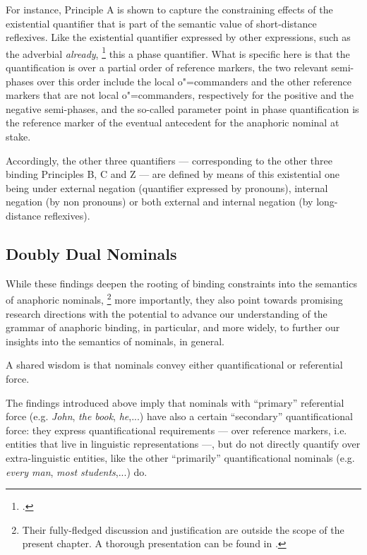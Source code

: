 \documentclass[output=paper
	        ,collection
	        ,collectionchapter
 	        ,biblatex
                ,babelshorthands
                ,newtxmath
                ,draftmode
                ,colorlinks, citecolor=brown
]{langscibook}
\begin{document}
For instance, Principle A is shown to capture the constraining effects of the existential quantifier 
that is part of the semantic value of short-distance reflexives. Like the existential
quantifier expressed by other expressions, such as the adverbial {\em already},%
\footnote{
\citep{Lobner1987}.
}
this a phase quantifier. What is specific here is that the quantification is over
a partial order of reference markers,  the two relevant semi-phases over this order
include the local o"=commanders and the other reference markers that are not
local o"=commanders, respectively for the positive and the negative semi-phases,
and the so-called parameter point in phase quantification is the reference
marker of the eventual antecedent for the anaphoric nominal at stake.

Accordingly, the other
three quantifiers --- corresponding to the other three binding Principles B, C and Z --- 
are defined by means of this existential one being under external negation (quantifier expressed by pronouns), 
internal negation (by non pronouns) or both external and internal negation (by long-distance reflexives).



\subsection{Doubly Dual Nominals \label{dualNominals}}

While these findings deepen the rooting of binding constraints into the semantics of anaphoric nominals,%
\footnote{
Their fully-fledged discussion and justification are outside the scope of the present chapter. A thorough presentation can be found in \citep{branco:2005}.} more importantly, they also point towards promising research directions
with the potential to advance our understanding of the grammar of anaphoric binding, in particular, 
and more widely, to further our insights into the semantics of nominals, in general.

A shared wisdom is that nominals convey either quantificational or referential
force. 

The findings introduced above imply that nominals with ``primary'' referential force 
(e.g. {\em John}, {\em the book}, {\em he},...) have also a certain ``secondary'' quantificational force: 
they express quantificational requirements --- over reference markers, i.e. entities that live in linguistic 
representations ---, but do not directly  quantify  over  extra-linguistic  
entities,  like  the  other  ``primarily'' quantificational nominals 
(e.g. {\em every man}, {\em most students},...) do.
\end{document}
